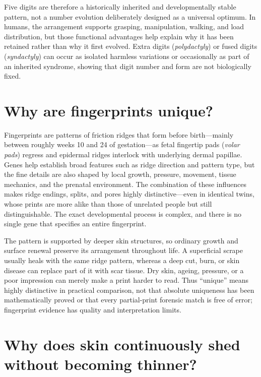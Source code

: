 \documentclass[11pt,oneside]{report}
\begin{document}
Five digits are therefore a historically inherited and developmentally stable
pattern, not a number evolution deliberately designed as a universal optimum.
In humans, the arrangement supports grasping, manipulation, walking, and load
distribution, but those functional advantages help explain why it has been
retained rather than why it first evolved. Extra digits (\emph{polydactyly}) or
fused digits (\emph{syndactyly}) can occur as isolated harmless variations or
occasionally as part of an inherited syndrome, showing that digit number and
form are not biologically fixed.

\section{Why are fingerprints unique?}

Fingerprints are patterns of friction ridges that form before birth—mainly
between roughly weeks 10 and 24 of gestation—as fetal fingertip pads
(\emph{volar pads}) regress and epidermal ridges interlock with underlying
dermal papillae. Genes help establish broad features such as ridge direction
and pattern type, but the fine details are also shaped by local growth,
pressure, movement, tissue mechanics, and the prenatal environment. The combination of these influences
makes ridge endings, splits, and pores highly distinctive---even in identical
twins, whose prints are more alike than those of unrelated people but still
distinguishable. The exact developmental process is complex, and there is no
single gene that specifies an entire fingerprint.

The pattern is supported by deeper skin structures, so ordinary growth and
surface renewal preserve its arrangement throughout life. A superficial scrape
usually heals with the same ridge pattern, whereas a deep cut, burn, or skin
disease can replace part of it with scar tissue. Dry skin, ageing, pressure,
or a poor impression can merely make a print harder to read. Thus ``unique''
means highly distinctive in practical comparison, not that absolute uniqueness
has been mathematically proved or that every partial-print forensic match is
free of error; fingerprint evidence has quality and interpretation limits.

\section{Why does skin continuously shed without becoming thinner?}
\end{document}
